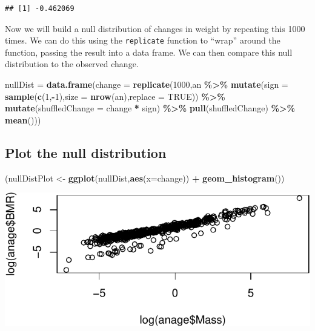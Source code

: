 \documentclass[
  a4paperpaper,
]{book}
\newenvironment{Shaded}{\begin{snugshade}}{\end{snugshade}}
\newcommand{\DataTypeTok}[1]{\textcolor[rgb]{0.13,0.29,0.53}{#1}}
\newcommand{\DecValTok}[1]{\textcolor[rgb]{0.00,0.00,0.81}{#1}}
\newcommand{\KeywordTok}[1]{\textcolor[rgb]{0.13,0.29,0.53}{\textbf{#1}}}
\newcommand{\NormalTok}[1]{#1}
\newcommand{\OperatorTok}[1]{\textcolor[rgb]{0.81,0.36,0.00}{\textbf{#1}}}
\newcommand{\OtherTok}[1]{\textcolor[rgb]{0.56,0.35,0.01}{#1}}
\newcommand{\StringTok}[1]{\textcolor[rgb]{0.31,0.60,0.02}{#1}}
\begin{document}
\begin{verbatim}
## [1] -0.462069
\end{verbatim}

Now we will build a null distribution of changes in weight by repeating this 1000 times. We can do this using the \texttt{replicate} function to ``wrap'' around the function, passing the result into a data frame. We can then compare this null distribution to the observed change.

\begin{Shaded}
\begin{Highlighting}[]
\NormalTok{nullDist =}\StringTok{ }\KeywordTok{data.frame}\NormalTok{(}\DataTypeTok{change =}
                        \KeywordTok{replicate}\NormalTok{(}\DecValTok{1000}\NormalTok{,an }\OperatorTok{\%\textgreater{}\%}
\StringTok{                                    }\KeywordTok{mutate}\NormalTok{(}\DataTypeTok{sign =} \KeywordTok{sample}\NormalTok{(}\KeywordTok{c}\NormalTok{(}\DecValTok{1}\NormalTok{,}\OperatorTok{{-}}\DecValTok{1}\NormalTok{),}\DataTypeTok{size =} \KeywordTok{nrow}\NormalTok{(an),}\DataTypeTok{replace =} \OtherTok{TRUE}\NormalTok{)) }\OperatorTok{\%\textgreater{}\%}
\StringTok{                                    }\KeywordTok{mutate}\NormalTok{(}\DataTypeTok{shuffledChange =}\NormalTok{ change }\OperatorTok{*}\StringTok{ }\NormalTok{sign) }\OperatorTok{\%\textgreater{}\%}
\StringTok{                                    }\KeywordTok{pull}\NormalTok{(shuffledChange) }\OperatorTok{\%\textgreater{}\%}
\StringTok{                                    }\KeywordTok{mean}\NormalTok{())) }
\end{Highlighting}
\end{Shaded}

\hypertarget{plot-the-null-distribution}{%
\subsection{Plot the null distribution}\label{plot-the-null-distribution}}

\begin{Shaded}
\begin{Highlighting}[]
\NormalTok{(nullDistPlot \textless{}{-}}\StringTok{ }\KeywordTok{ggplot}\NormalTok{(nullDist,}\KeywordTok{aes}\NormalTok{(}\DataTypeTok{x=}\NormalTok{change)) }\OperatorTok{+}
\StringTok{  }\KeywordTok{geom\_histogram}\NormalTok{())}
\end{Highlighting}
\end{Shaded}

\includegraphics{BB852_files/figure-latex/unnamed-chunk-158-1.pdf}
\end{document}
